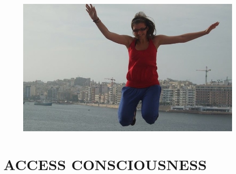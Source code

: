 \documentclass[10pt,foldmark,notumble]{leaflet}
\begin{document}
\vspace*{20mm}
\begin{figure}[h]
 \centering
 \includegraphics [angle=270, scale=.525]{Bild3.jpg}
 \label{figure1}
\end{figure}


\newpage

\section{ACCESS CONSCIOUSNESS \textsuperscript{\textregistered}}
\end{document}
